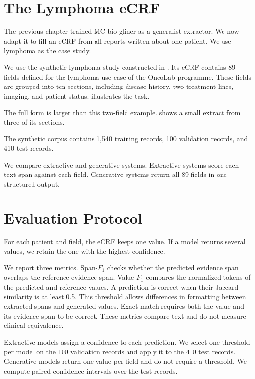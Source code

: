 \section{The Lymphoma eCRF}

The previous chapter trained MC-bio-gliner as a generalist extractor. We now
adapt it to fill an eCRF from all reports written about one patient. We use
lymphoma as the case study.

We use the synthetic lymphoma study constructed in . Its
eCRF contains 89 fields defined for the lymphoma use case of the OncoLab
programme. These fields are grouped into ten sections, including disease
history, two treatment lines, imaging, and patient status.
 illustrates the task.



The full form is larger than this two-field example. 
shows a small extract from three of its sections.



The synthetic corpus contains 1,540 training records, 100 validation records,
and 410 test records.

We compare extractive and generative systems. Extractive systems score each
text span against each field. Generative systems return all 89 fields in one
structured output.

\section{Evaluation Protocol}

For each patient and field, the eCRF keeps one value. If a model returns several
values, we retain the one with the highest confidence.

We report three metrics. Span-$F_1$ checks whether the predicted evidence span
overlaps the reference evidence span. Value-$F_1$ compares the normalized tokens
of the predicted and reference values. A prediction is correct when their
Jaccard similarity is at least 0.5. This threshold allows differences in
formatting between extracted spans and generated values. Exact match requires
both the value and its evidence span to be correct. These metrics compare text
and do not measure clinical equivalence.

Extractive models assign a confidence to each prediction. We select one
threshold per model on the 100 validation records and apply it to the 410 test
records. Generative models return one value per field and do not require a
threshold. We compute paired confidence intervals over the test records.

